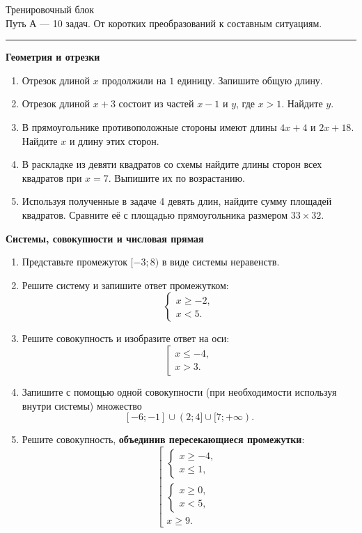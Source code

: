 \documentclass[a4paper,12pt]{article}
\newcommand{\sectionline}{\vspace{1mm}\par\noindent\textcolor{accent}{\rule{\linewidth}{0.45pt}}\par\vspace{1mm}}
\begin{document}
\begin{center}
{\Large\textcolor{darkaccent}{Тренировочный блок}}\\[2mm]
{\small Путь А --- 10 задач. От коротких преобразований к составным ситуациям.}
\end{center}
\sectionline
\textcolor{darkaccent}{\textbf{Геометрия и отрезки}}
\begin{enumerate}[label=\textbf{\arabic*.}]
\item Отрезок длиной $x$ продолжили на $1$ единицу. Запишите общую длину.
\item Отрезок длиной $x+3$ состоит из частей $x-1$ и $y$, где $x>1$. Найдите $y$.
\item В прямоугольнике противоположные стороны имеют длины $4x+4$ и $2x+18$. Найдите $x$ и длину этих сторон.
\item В раскладке из девяти квадратов со схемы найдите длины сторон всех квадратов при $x=7$. Выпишите их по возрастанию.
\item Используя полученные в задаче 4 девять длин, найдите сумму площадей квадратов. Сравните её с площадью прямоугольника размером $33\times32$.
\end{enumerate}
\vspace{4mm}
\textcolor{darkaccent}{\textbf{Системы, совокупности и числовая прямая}}
\begin{enumerate}[label=\textbf{\arabic*.},start=6]
\item Представьте промежуток $[-3;8)$ в виде системы неравенств.
\item Решите систему и запишите ответ промежутком:
\[\begin{cases}x\ge-2,\\x<5.\end{cases}\]
\item Решите совокупность и изобразите ответ на оси:
\[\left[\begin{array}{l}x\le-4,\\x>3.\end{array}\right.\]
\item Запишите с помощью одной совокупности (при необходимости используя внутри системы) множество
\[[-6;-1]\cup(2;4]\cup[7;+\infty).\]
\item Решите совокупность, \textbf{объединив пересекающиеся промежутки}:
\[\left[\begin{array}{l}
\begin{cases}x\ge-4,\\x\le1,\end{cases}\\[4pt]
\begin{cases}x\ge0,\\x<5,\end{cases}\\[4pt]
x\ge9.
\end{array}\right.\]
\end{enumerate}
\clearpage
\end{document}
